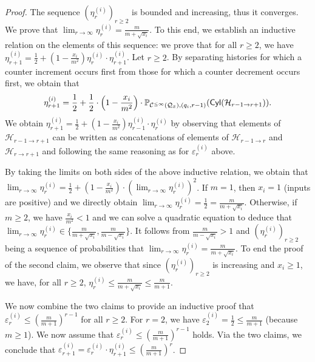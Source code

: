 \documentclass[a4paper,UKenglish,cleveref,autoref,thm-restate,colorlinks]{lipics-v2021}
\newcommand{\sqsx}{x} \newcommand{\sqsxVect}{\bar{x}} \newcommand{\sqsm}{m} \newcommand{\sqsy}{y} \newcommand{\sqsi}{i} \newcommand{\sqsn}{n} \newcommand{\sqsSize}{E}
\newcommand{\cyl}[1]{\mathsf{Cyl}(#1)}
\newcommand{\histPart}{\mathcal{H}}
\newcommand{\ocmdp}{\mathcal{Q}}
\newcommand{\ocState}{q}
\newcommand{\counterUB}{r}
\newcommand{\mchain}{\mathcal{C}}
\newcommand{\ocChainFin}[2]{\mchain^{\leq #2}(#1)}
\newcommand{\chainX}{\ocmdp_{\sqsxVect}}
\newcommand{\eleError}[1]{\varepsilon_{#1}}
\newcommand{\eleB}[1]{\eleError{#1}^{(\sqsi)}}
\newcommand{\eleD}[1]{\eta^{(\sqsi)}_{#1}}
\newcommand{\seqD}{(\eleD{\counterUB})_{\counterUB\geq 2}}
\begin{document}
\begin{proof}
  The sequence $\seqD$ is bounded and increasing, thus it converges.
  We prove that $\lim_{\counterUB\to\infty}\eleD{\counterUB}=\frac{\sqsm}{\sqsm+\sqrt{\sqsx_\sqsi}}$.
  To this end, we establish an inductive relation on the elements of this sequence: we prove that for all $\counterUB\geq 2$, we have $\eleD{\counterUB+1} = \frac{1}{2} + (1-\frac{\sqsx_\sqsi}{\sqsm^2})\eleD{\counterUB}\cdot \eleD{\counterUB+1}$.
  Let $\counterUB\geq 2$.
  By separating histories for which a counter increment occurs first from those for which a counter decrement occurs first, we obtain that
  \[\eleD{\counterUB+1} =
    \frac{1}{2} +
    \frac{1}{2}\cdot \left(1-\frac{\sqsx_\sqsi}{\sqsm^2}\right)\cdot
    \probaMCverb{\ocChainFin{\chainX}{\infty}}{(\ocState_\sqsi, \counterUB-1)}(\cyl{\histPart_{\counterUB-1\to\counterUB+1}}).\]
  We obtain $\eleD{\counterUB+1} = \frac{1}{2} + (1-\frac{\sqsx_\sqsi}{\sqsm^2})\eleD{\counterUB-1}\cdot \eleD{\counterUB}$ by observing that elements of $\histPart_{\counterUB-1\to\counterUB+1}$ can be written as concatenations of elements of $\histPart_{\counterUB-1\to\counterUB}$ and $\histPart_{\counterUB\to\counterUB+1}$ and following the same reasoning as for $\eleB{\counterUB}$ above.

  By taking the limits on both sides of the above inductive relation, we obtain that $\lim_{\counterUB\to\infty}\eleD{\counterUB} = \frac{1}{2} + (1-\frac{\sqsx_\sqsi}{\sqsm^2})\cdot(\lim_{\counterUB\to\infty}\eleD{\counterUB})^2$.
  If $\sqsm=1$, then $\sqsx_\sqsi=1$ (inputs are positive) and we directly obtain $\lim_{\counterUB\to\infty}\eleD{\counterUB} = \frac{1}{2} = \frac{\sqsm}{\sqsm+\sqrt{\sqsx_\sqsi}}$.
  Otherwise, if $\sqsm\geq 2$, we have $\frac{\sqsx_\sqsi}{\sqsm^2}<1$ and we can solve a quadratic equation to deduce that $\lim_{\counterUB\to\infty}\eleD{\counterUB}\in\{\frac{\sqsm}{\sqsm +\sqrt{\sqsx_\sqsi}}, \frac{\sqsm}{\sqsm - \sqrt{\sqsx_\sqsi}}\}$.
  It follows from $\frac{\sqsm}{\sqsm - \sqrt{\sqsx_\sqsi}}> 1$ and $\seqD$ being a sequence of probabilities that $\lim_{\counterUB\to\infty}\eleD{\counterUB}=\frac{\sqsm}{\sqsm +\sqrt{\sqsx_\sqsi}}$.
  To end the proof of the second claim, we observe that since $\seqD$ is increasing and $\sqsx_\sqsi\geq 1$, we have, for all $\counterUB\geq 2$, $\eleD{\counterUB}\leq\frac{\sqsm}{\sqsm+\sqrt{\sqsx_\sqsi}}\leq\frac{\sqsm}{\sqsm+1}$.

  We now combine the two claims to provide an inductive proof that $\eleB{\counterUB}\leq(\frac{\sqsm}{\sqsm+1})^{\counterUB-1}$ for all $\counterUB\geq 2$.
  For $\counterUB=2$, we have $\eleB{2}=\frac{1}{2}\leq \frac{\sqsm}{\sqsm+1}$ (because $\sqsm\geq 1$).
  We now assume that $\eleB{\counterUB}\leq(\frac{\sqsm}{\sqsm+1})^{\counterUB-1}$ holds.
  Via the two claims, we conclude that $\eleB{\counterUB+1} = \eleB{\counterUB}\cdot\eleD{\counterUB+1}\leq(\frac{\sqsm}{\sqsm+1})^{\counterUB}$.
\end{proof}
\end{document}
